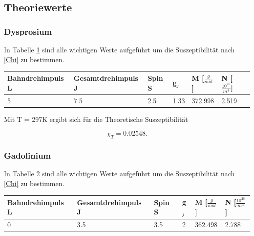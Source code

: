 \subsection{Theoriewerte}

\subsubsection{Dysprosium}

In Tabelle \ref{tab:9} sind alle wichtigen Werte aufgeführt um die Suszeptibilität nach \ref{Chi} zu bestimmen. 

\begin{minipage}{\linewidth}
    \begin{table}[H]
        \centering
    \begin{tabular}{lllllll}
        \toprule
        Bahndrehimpuls L & Gesamtdrehimpuls J & Spin S & g$_j$ & M [$ \frac{g}{mol} $] & N [$ \frac{10^{28}}{m^3} $] \\
        \midrule
        5 & 7.5 & 2.5 & 1.33 & 372.998 & 2.519 \\
        \bottomrule   
    \end{tabular}
    
    \label{tab:9}
\end{table}
\end{minipage}

Mit T = 297K ergibt sich für die Theoretische Suszeptibilität

\begin{equation*}
    \chi_T = 0.02548.
\end{equation*}

\subsubsection{Gadolinium}

In Tabelle \ref{tab:TGa} sind alle wichtigen Werte aufgeführt um die Suszeptibilität nach \ref{Chi} zu bestimmen. 

\begin{minipage}{\linewidth}
    \begin{table}[H]
        \centering
    \begin{tabular}{llllll}
        \toprule
        Bahndrehimpuls L & Gesamtdrehimpuls J & Spin S & g$_j$ & M [$ \frac{g}{mol} $] & N [$ \frac{10^{28}}{m^3} $] \\
        \midrule
        0 & 3.5 & 3.5 & 2 & 362.498 & 2.788 \\
        \bottomrule   
    \end{tabular}
    
    \label{tab:TGa}
\end{table}
\end{minipage}

